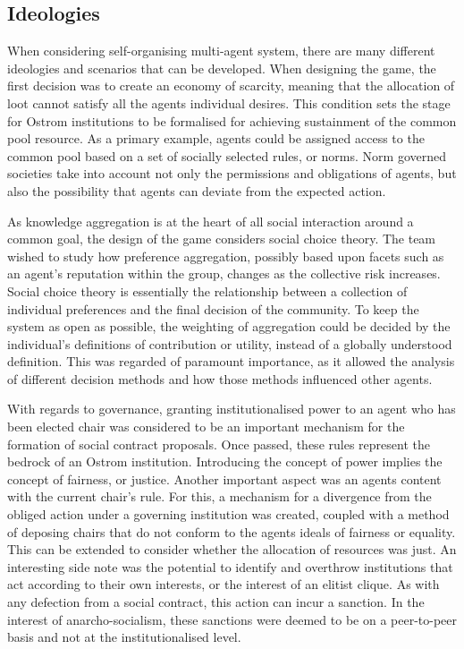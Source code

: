 \subsection{Ideologies}\label{sec: ideologies}

When considering self-organising multi-agent system, there are many different ideologies and scenarios that can be developed. When designing the game, the first decision was to create an economy of scarcity, meaning that the allocation of loot cannot satisfy all the agents individual desires. This condition sets the stage for Ostrom institutions to be formalised for achieving sustainment of the common pool resource. As a primary example, agents could be assigned access to the common pool based on a set of socially selected rules, or norms. Norm governed societies take into account not only the permissions and obligations of agents, but also the possibility that agents can deviate from the expected action. 

As knowledge aggregation is at the heart of all social interaction around a common goal, the design of the game considers social choice theory. The team wished to study how preference aggregation, possibly based upon facets such as an agent's reputation within the group, changes as the collective risk increases. Social choice theory is essentially the relationship between a collection of individual preferences and the final decision of the community. To keep the system as open as possible, the weighting of aggregation could be decided by the individual's definitions of contribution or utility, instead of a globally understood definition. This was regarded of paramount importance, as it allowed the analysis of different decision methods and how those methods influenced other agents. 

With regards to governance, granting institutionalised power to an agent who has been elected chair was considered to be an important mechanism for the formation of social contract proposals. Once passed, these rules represent the bedrock of an Ostrom institution. Introducing the concept of power implies the concept of fairness, or justice. Another important aspect was an agents content with the current chair's rule. For this, a mechanism for a divergence from the obliged action under a governing institution was created, coupled with a method of deposing chairs that do not conform to the agents ideals of fairness or equality. This can be extended to consider whether the allocation of resources was just. An interesting side note was the potential to identify and overthrow institutions that act according to their own interests, or the interest of an elitist clique. As with any defection from a social contract, this action can incur a sanction. In the interest of anarcho-socialism, these sanctions were deemed to be on a peer-to-peer basis and not at the institutionalised level. 

